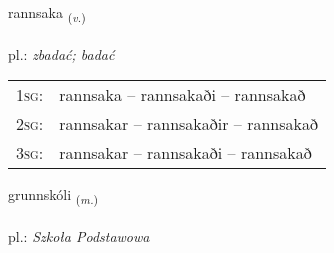 \documentclass[frontgrid, backgrid]{flacards}\usepackage[]{graphicx}\usepackage[]{xcolor}
\begin{document}
\renewcommand{\flhead}{\vskip5pt \fboxsep=0pt {\small\bfseries\footnotesize Sagnorð | Verb}}
\renewcommand{\fcfoot}{\vskip5pt \fboxsep=0pt \hspace{2pt}{\small\bfseries\footnotesize 2K}}

\renewcommand{\blhead}{\vskip5pt {\small\bfseries\footnotesize Sagnorð | Verb }}
\renewcommand{\bcfoot}{\vskip5pt \hspace{2pt}{\small\bfseries\footnotesize 2K}}


{rannsaka \small{\textsubscript{(\textit{v.})}} \\[1ex] %
\textphonetic{[ransaka]} \\
pl.: \emph{zbadać; badać} \\  [2ex]
\renewcommand*{\arraystretch}{0.8}
\begin{tabular}{p{1cm}l}
\textsc{1sg}: & rannsaka -- rannsakaði -- rannsakað \\ 
\textsc{2sg}: & rannsakar -- rannsakaðir -- rannsakað \\ 
\textsc{3sg}: & rannsakar -- rannsakaði -- rannsakað \\ 
\end{tabular}
}

\renewcommand{\flhead}{\vskip5pt \fboxsep=0pt {\small\bfseries\footnotesize Nafnorð | Noun}}
\renewcommand{\fcfoot}{\vskip5pt \fboxsep=0pt \hspace{2pt}{\small\bfseries\footnotesize 2K}}

\renewcommand{\blhead}{\vskip5pt {\small\bfseries\footnotesize Nafnorð | Noun }}
\renewcommand{\bcfoot}{\vskip5pt \hspace{2pt}{\small\bfseries\footnotesize 2K}}


{grunnskóli \small{\textsubscript{(\textit{m.})}} \\[1ex] %
\textphonetic{[krʏnskoulɪ]} \\
pl.: \emph{Szkoła Podstawowa} \\  [2ex]
\renewcommand*{\arraystretch}{0.8}
}
\end{document}
